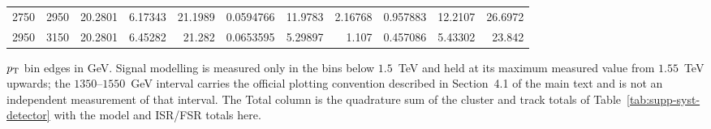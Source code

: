 \begin{landscape}
\begin{table}[p]
\begin{tabular}{rr rrr rrrr r r}
2750 & 2950 & 20.2801 & 6.17343 & 21.1989 & 0.0594766 & 11.9783 & 2.16768 & 0.957883 & 12.2107 & 26.6972 \\
2950 & 3150 & 20.2801 & 6.45282 & 21.282 & 0.0653595 & 5.29897 & 1.107 & 0.457086 & 5.43302 & 23.842 \\
\bottomrule
\end{tabular}
\par\vspace{4pt}
\begin{minipage}{\textwidth}\footnotesize $p_{\mathrm{T}}$ bin edges in GeV. Signal modelling is measured only in the bins below $1.5$~TeV and held at its maximum measured value from $1.55$~TeV upwards; the $1350$--$1550$~GeV interval carries the official plotting convention described in Section~4.1 of the main text and is not an independent measurement of that interval. The Total column is the quadrature sum of the cluster and track totals of Table~\ref{tab:supp-syst-detector} with the model and ISR/FSR totals here.\end{minipage}
\end{table}
\end{landscape}
